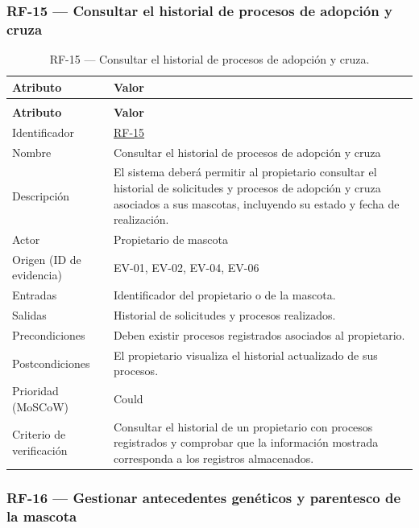 \documentclass[journal,onecolumn]{IEEEtran}
\makeatletter
\newenvironment{atributos}[2]{%
	\small
	\begin{longtable}{@{}>{\raggedright\arraybackslash}p{4.2cm} >{\raggedright\arraybackslash}p{11.2cm}@{}}
		\caption{#2}\label{tab:#1}\\
		\toprule
		\textbf{Atributo} & \textbf{Valor} \\
		\midrule
		\endfirsthead
		\multicolumn{2}{@{}l}{\small\itshape (continuación)}\\
		\toprule
		\textbf{Atributo} & \textbf{Valor} \\
		\midrule
		\endhead
		\bottomrule
		\endlastfoot
	}{%
	\end{longtable}
	\normalsize
}
\makeatother
\begin{document}
	\subsubsection{RF-15 --- Consultar el historial de procesos de adopción y cruza}
	
	\begin{atributos}{RF-15}{RF-15 --- Consultar el historial de procesos de adopción y cruza.}
		Identificador & \hyperref[tab:RF-15]{RF-15} \\
		Nombre & Consultar el historial de procesos de adopción y cruza \\
		Descripción & El sistema deberá permitir al propietario consultar el historial de solicitudes y procesos de adopción y cruza asociados a sus mascotas, incluyendo su estado y fecha de realización. \\
		Actor & Propietario de mascota \\
		Origen (ID de evidencia) & EV-01, EV-02, EV-04, EV-06 \\
		Entradas & Identificador del propietario o de la mascota. \\
		Salidas & Historial de solicitudes y procesos realizados. \\
		Precondiciones & Deben existir procesos registrados asociados al propietario. \\
		Postcondiciones & El propietario visualiza el historial actualizado de sus procesos. \\
		Prioridad (MoSCoW) & Could \\
		Criterio de verificación & Consultar el historial de un propietario con procesos registrados y comprobar que la información mostrada corresponda a los registros almacenados. \\
	\end{atributos}
	
	\subsubsection{RF-16 --- Gestionar antecedentes genéticos y parentesco de la mascota}
	
\end{document}
